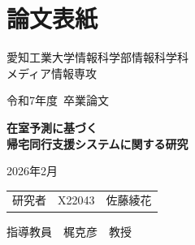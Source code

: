 \chapter{論文表紙}
\thispagestyle{myheadings}

\vspace{-1.0cm}

\begin{center}

  {\LARGE 愛知工業大学情報科学部情報科学科\\
    メディア情報専攻

    \vspace{1.0cm}

    令和7年度~卒業論文\\

    \vspace{2.0cm}

    {\Huge
      \baselineskip=15mm
      \textbf{在室予測に基づく\\
        帰宅同行支援システムに関する研究\\}
    }

    \vspace{7.0cm}

    2026年2月\\

    \vspace{1.0cm}

    \begin{tabular}[h]{lll}
      研究者 & X22043 & 佐藤綾花
    \end{tabular}

    \vspace{1.0cm}

    指導教員\ \ 梶克彦\ \ 教授}

\end{center}

